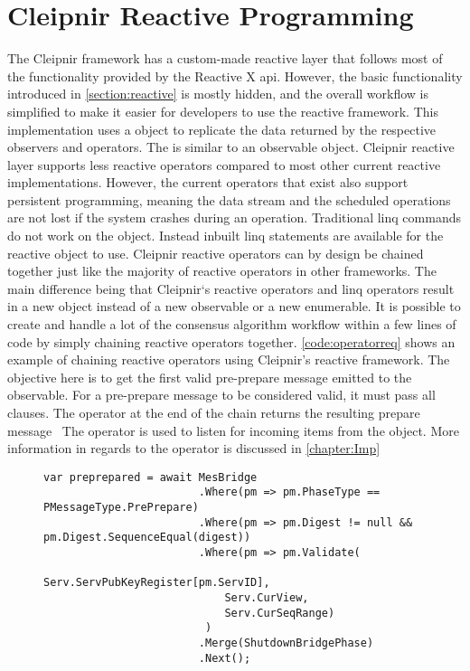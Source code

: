 \section{Cleipnir Reactive Programming}
The Cleipnir framework has a custom-made reactive layer that follows most of the functionality provided by the Reactive X \ac{api}. However, the basic functionality introduced in \autoref{section:reactive} is mostly hidden, and the overall workflow is simplified to make it easier for developers to use the reactive framework. This implementation uses a  object to replicate the data returned by the respective observers and operators. The  is similar to an observable object.
Cleipnir reactive layer supports less reactive operators compared to most other current reactive implementations. However, the current operators that exist also support persistent programming, meaning the data stream and the scheduled operations are not lost if the system crashes during an operation. Traditional \ac{linq} commands do not work on the  object. Instead inbuilt \ac{linq} statements are available for the reactive  object to use. Cleipnir reactive operators can by design be chained together just like the majority of reactive operators in other frameworks. The main difference being that Cleipnir`s reactive operators and \ac{linq} operators result in a new  object instead of a new observable or a new enumerable. It is possible to create and handle a lot of the consensus algorithm workflow within a few lines of code by simply chaining reactive operators together. \autoref{code:operatorreq} shows an example of chaining reactive operators using Cleipnir’s reactive framework. The objective here is to get the first valid pre-prepare message emitted to the observable. For a pre-prepare message to be considered valid, it must pass all  clauses. The  operator at the end of the chain returns the resulting prepare message~\cites[p.~6,8,13]{PAPER:PaxosCleipnir, WEB:ReactiveOperator} The  operator is used to listen for incoming items from the   object. More information in regards to the  operator is discussed in \autoref{chapter:Imp}


\begin{figure}[H]
	\centering
	\begin{lstlisting}[label = code:operatorreq, caption=Chaining Cleipnir Operators, captionpos=b, basicstyle=\scriptsize]
var preprepared = await MesBridge
                        .Where(pm => pm.PhaseType == PMessageType.PrePrepare)
                        .Where(pm => pm.Digest != null && pm.Digest.SequenceEqual(digest))
                        .Where(pm => pm.Validate(
                            Serv.ServPubKeyRegister[pm.ServID], 
                            Serv.CurView, 
                            Serv.CurSeqRange)
                         )
                        .Merge(ShutdownBridgePhase)
                        .Next();
\end{lstlisting}
\end{figure}

